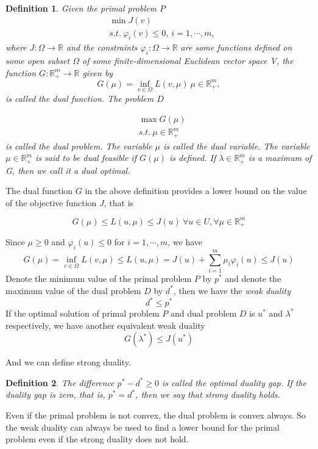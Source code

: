 \documentclass[a4paper]{report}
\newtheorem{definition}{Definition}[section]
\begin{document}
\begin{definition}
    Given the primal problem $P$
    \begin{align*}
        &\min J(v)\\
        &s.t.\ \varphi_i(v)\leq 0, \ i=1,\cdots,m,
    \end{align*}
    where $J:\Omega\to\mathbb R$ and the constraints $\varphi_i:\Omega\to\mathbb R$ are some functions defined on some open subset $\Omega$ of some finite-dimensional Euclidean vector space V, the function $G:\mathbb R_+^m\to\mathbb R$ given by
    \[
        G(\mu)=\inf_{v\in\Omega}L(v,\mu)\ \mu\in\mathbb R_+^m,
    \]
    is called the dual function. The problem $D$
    
    \begin{align*}
        &\max G(\mu)\\
        &s.t.\ \mu\in\mathbb R_+^m
    \end{align*}
    is called the dual problem. The variable $\mu$ is called the dual variable. The variable $\mu\in\mathbb R_+^m$ is said to be dual feasible if $G(\mu)$ is defined. If $\lambda\in\mathbb R_+^m$ is a maximum of G, then we call it a dual optimal.
\end{definition}

The dual function $G$ in the above definition provides a lower bound on the value of the objective function $J$, that is

\[
    G(\mu)\leq L(u,\mu)\leq J(u)\ \forall u\in U, \forall \mu\in\mathbb R_+^m
\]

Since $\mu\geq 0$ and $\varphi_i(u)\leq 0$ for $i=1,\cdots,m$, we have
\[
    G(\mu)=\inf_{v\in\Omega}L(v,\mu)\leq L(u,\mu)=J(u)+\sum_{i=1}^m\mu_i\varphi_i(u)\leq J(u)
\]
Denote the minimum value of the primal problem $P$ by $p^*$ and denote the maximum value of the dual problem $D$ by $d^*$, then we have the \emph{weak duality}
\[
    d^*\leq p^*
\]
If the optimal solution of primal problem $P$ and dual problem $D$ is $u^*$ and $\lambda^*$ respectively, we have another equivalent weak duality
\[
    G(\lambda^*)\leq J(u^*)
\]

And we can define strong duality.

\begin{definition}
    The difference $p^*-d^* \geq 0$ is called the \emph{optimal duality gap}. If the duality gap is zero, that is, $p^*=d^*$, then we say that \emph{strong duality} holds.
\end{definition}

Even if the primal problem is not convex, the dual problem is convex always. So the weak duality can always be used to find a lower bound for the primal problem even if the strong duality does not hold.
\end{document}
